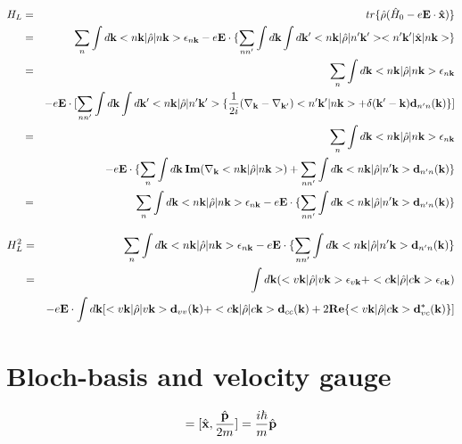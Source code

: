 \documentclass[aps,prb,preprint]{revtex4-1}
\begin{document}
\begin{appendix}
 \begin{eqnarray}
H_L &=& tr\{\hat{\rho}( \hat{H}_0 -e{\bf E \cdot \hat{x}}) \} \nonumber \\
&=& \sum_n \int d{\bf k} <n{\bf k}| \hat{\rho} |n{\bf k}> \epsilon_{n{\bf k}} - e{\bf E} \cdot \{ \sum_{nn'} \int d{\bf k} \int d{\bf k'} <n{\bf k}| \hat{\rho} |n'{\bf k'}><n'{\bf k'}| \hat{\bf x} |n{\bf k}> \} \nonumber \\
&=& \sum_n \int d{\bf k} <n{\bf k}| \hat{\rho} |n{\bf k}> \epsilon_{n{\bf k}} \nonumber \\
&& - e{\bf E} \cdot [ \sum_{nn'} \int d{\bf k} \int d{\bf k'} <n{\bf k}| \hat{\rho} |n'{\bf k'}> \{ \frac{1}{2i}(\nabla_{\bf k}-\nabla_{\bf k'}) <n'{\bf k'}|n{\bf k}> + \delta({\bf k'-k}) {\bf d}_{n'n}({\bf k})\} ]\nonumber \\
&=& \sum_n \int d{\bf k} <n{\bf k}| \hat{\rho} |n{\bf k}> \epsilon_{n{\bf k}} \nonumber \\
&& - e{\bf E} \cdot \{ \sum_{n} \int d{\bf k} \:{\bf Im}( \nabla_{\bf k}  <n{\bf k}| \hat{\rho} |n{\bf k}> ) + \sum_{nn'} \int d{\bf k} <n{\bf k}| \hat{\rho} |n'{\bf k}> {\bf d}_{n'n}({\bf k})\} \nonumber \\
&=& \sum_n \int d{\bf k} <n{\bf k}| \hat{\rho} |n{\bf k}> \epsilon_{n{\bf k}} - e{\bf E} \cdot \{ \sum_{nn'} \int d{\bf k} <n{\bf k}| \hat{\rho} |n'{\bf k}> {\bf d}_{n'n}({\bf k})\} 
\end{eqnarray}

 \begin{eqnarray}
H_L^2 &=& \sum_n \int d{\bf k} <n{\bf k}| \hat{\rho} |n{\bf k}> \epsilon_{n{\bf k}} - e{\bf E} \cdot \{ \sum_{nn'} \int d{\bf k} <n{\bf k}| \hat{\rho} |n'{\bf k}> {\bf d}_{n'n}({\bf k})\} \nonumber \\
&=&  \int d{\bf k} ( <v{\bf k}| \hat{\rho} |v{\bf k}> \epsilon_{v{\bf k}} + <c{\bf k}| \hat{\rho} |c{\bf k}> \epsilon_{c{\bf k}} ) \nonumber \\
&& - e{\bf E} \cdot  \int d{\bf k} [ <v{\bf k}| \hat{\rho} |v{\bf k}> {\bf d}_{vv}({\bf k}) + <c{\bf k}| \hat{\rho} |c{\bf k}> {\bf d}_{cc}({\bf k}) + 2{\bf Re}\{ <v{\bf k}| \hat{\rho} |c{\bf k}> {\bf d}_{vc}^*({\bf k}) \} ]   \nonumber \\
\end{eqnarray}

\section{Bloch-basis and velocity gauge}
\begin{eqnarray}
[\hat{\bf x}, \hat{H}_0] = [\hat{\bf x}, \frac{\hat{\bf p}}{2m}]  =\frac{i \hbar}{m}\hat{\bf p}
\end{eqnarray} 


\end{appendix}
\end{document}
